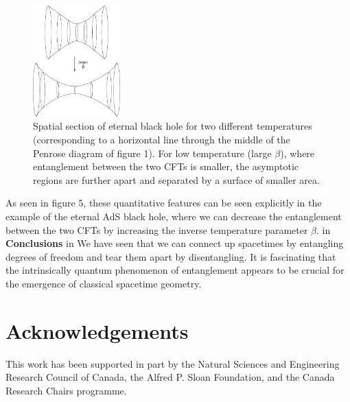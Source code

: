 \documentclass[12pt,epsf]{article}
\renewcommand{\(}{\left(}
\renewcommand{\)}{\right)}
\begin{document}
\begin{figure}
\centering
\includegraphics[width=0.3\textwidth]{throats.eps}
\caption{Spatial section of eternal black hole for two different temperatures (corresponding to a horizontal line through the middle of the Penrose diagram of figure 1). For low temperature (large $\beta$), where entanglement between the two CFTs is smaller, the asymptotic regions are further apart and separated by a surface of smaller area.}
\end{figure}
As seen in figure 5, these quantitative features can be seen explicitly in the example of the eternal AdS black hole, where we can decrease the entanglement between the two CFTs by increasing the inverse temperature parameter $\beta$.
 in
\noindent
{\bf Conclusions}
 in
\noindent
We have seen that we can connect up spacetimes by entangling degrees of freedom and tear them apart by disentangling. It is fascinating that the intrinsically quantum phenomenon of entanglement appears to be crucial for the emergence of classical spacetime geometry.

\section*{Acknowledgements}
This work has been supported in part by the Natural Sciences and Engineering Research Council of Canada, the Alfred P. Sloan Foundation, and the Canada Research Chairs programme.
\end{document}
